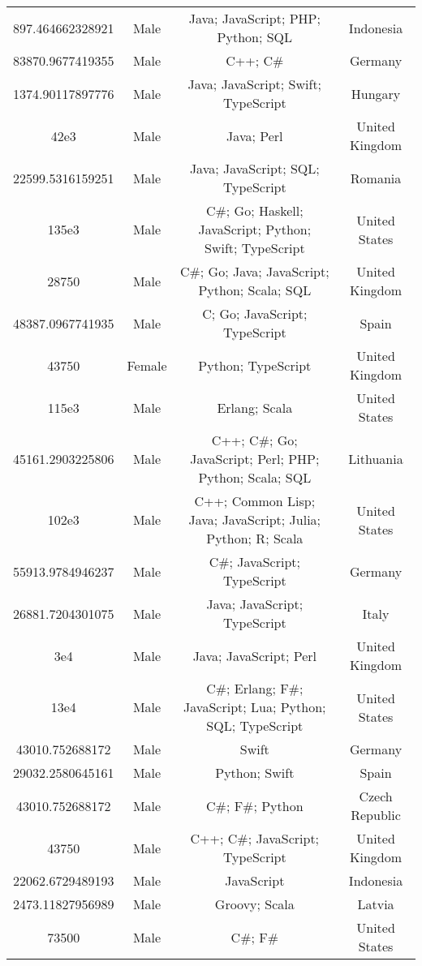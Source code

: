 \begin{center}
\begin{tabular}{ |c|c|c|c| }
897.464662328921  &  Male  &  Java; JavaScript; PHP; Python; SQL  &  Indonesia  \\ 
83870.9677419355  &  Male  &  C++; C\#  &  Germany  \\ 
1374.90117897776  &  Male  &  Java; JavaScript; Swift; TypeScript  &  Hungary  \\ 
42e3  &  Male  &  Java; Perl  &  United Kingdom  \\ 
22599.5316159251  &  Male  &  Java; JavaScript; SQL; TypeScript  &  Romania  \\ 
135e3  &  Male  &  C\#; Go; Haskell; JavaScript; Python; Swift; TypeScript  &  United States  \\ 
28750  &  Male  &  C\#; Go; Java; JavaScript; Python; Scala; SQL  &  United Kingdom  \\ 
48387.0967741935  &  Male  &  C; Go; JavaScript; TypeScript  &  Spain  \\ 
43750  &  Female  &  Python; TypeScript  &  United Kingdom  \\ 
115e3  &  Male  &  Erlang; Scala  &  United States  \\ 
45161.2903225806  &  Male  &  C++; C\#; Go; JavaScript; Perl; PHP; Python; Scala; SQL  &  Lithuania  \\ 
102e3  &  Male  &  C++; Common Lisp; Java; JavaScript; Julia; Python; R; Scala  &  United States  \\ 
55913.9784946237  &  Male  &  C\#; JavaScript; TypeScript  &  Germany  \\ 
26881.7204301075  &  Male  &  Java; JavaScript; TypeScript  &  Italy  \\ 
3e4  &  Male  &  Java; JavaScript; Perl  &  United Kingdom  \\ 
13e4  &  Male  &  C\#; Erlang; F\#; JavaScript; Lua; Python; SQL; TypeScript  &  United States  \\ 
43010.752688172  &  Male  &  Swift  &  Germany  \\ 
29032.2580645161  &  Male  &  Python; Swift  &  Spain  \\ 
43010.752688172  &  Male  &  C\#; F\#; Python  &  Czech Republic  \\ 
43750  &  Male  &  C++; C\#; JavaScript; TypeScript  &  United Kingdom  \\ 
22062.6729489193  &  Male  &  JavaScript  &  Indonesia  \\ 
2473.11827956989  &  Male  &  Groovy; Scala  &  Latvia  \\ 
73500  &  Male  &  C\#; F\#  &  United States  \\ 

\end{tabular}
\end{center}
